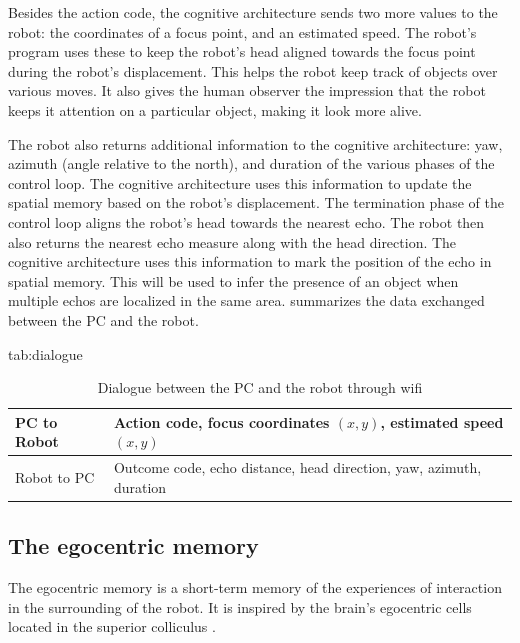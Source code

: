 \documentclass[pmlr]{jmlr}%
\begin{document}
Besides the action code, the cognitive architecture sends two more values to the robot: the coordinates of a focus point, and an estimated speed. 
The robot's program uses these to keep the robot's head aligned towards the focus point during the robot's displacement. 
This helps the robot keep track of objects over various moves. 
It also gives the human observer the impression that the robot keeps it attention on a particular object, making it look more alive. 

The robot also returns additional information to the cognitive architecture: yaw, azimuth (angle relative to the north), and duration of the various phases of the control loop. 
The cognitive architecture uses this information to update the spatial memory based on the robot's displacement. 
The termination phase of the control loop aligns the robot's head towards the nearest echo. 
The robot then also returns the nearest echo measure along with the head direction. 
The cognitive architecture uses this information to mark the position of the echo in spatial memory. 
This will be used to infer the presence of an object when multiple echos are localized in the same area. 
 summarizes the data exchanged between the PC and the robot.

\begin{table}[htbp]
	\floatconts
	{tab:dialogue}%
	{\caption{Dialogue between the PC and the robot through wifi}}%
	{\begin{tabular}{l|l}
			\toprule
			PC to Robot & Action code, focus coordinates $(x, y)$, estimated speed $(x, y)$\\
			\midrule
			Robot to PC & Outcome code, echo distance, head direction, yaw, azimuth, duration\\
			\bottomrule
	\end{tabular}}
\end{table}

\subsection{The egocentric memory}

The egocentric memory is a short-term memory of the experiences of interaction in the surrounding of the robot. 
It is inspired by the brain's egocentric cells located in the superior colliculus \citep{grieves_representation_2017}.
\end{document}

